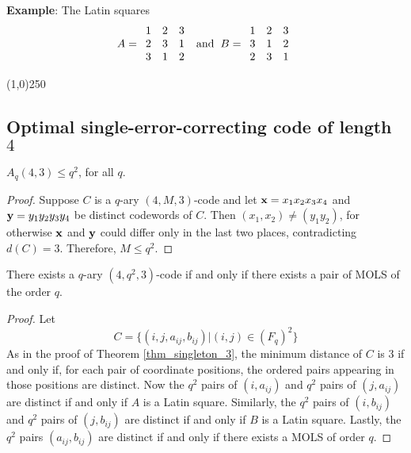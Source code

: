 \documentclass[../main.tex]{subfiles}
\begin{document}
\textbf{Example}: The Latin squares 
\[	A=
	\begin{array}{ccc}
		1 & 2 & 3\\
		2 & 3 & 1\\
		3 & 1 & 2
	\end{array}
	\hspace{2mm}
	\text{and}
	\hspace{2mm}
	B=
	\begin{array}{ccc}
		1 & 2 & 3\\
		3 & 1 & 2\\
		2 & 3 & 1
	\end{array}
\]

\begin{center}
\line(1,0){250}
\end{center}
   
\subsection{Optimal single-error-correcting code of length $4$}

\begin{thm}\label{thm_singleton_3}
	$A_q(4,3)\leq q^2$, for all $q$.
\end{thm}

\begin{proof}
	Suppose $C$ is a $q$-ary $(4,M,3)$-code and let $\textbf{x}=x_1x_2x_3x_4$ and $\textbf{y}=y_1y_2y_3y_4$ be distinct codewords of $C$. Then $(x_1,x_2)\neq (y_1y_2)$, for otherwise $\textbf{x}$ and $\textbf{y}$ could differ only in the last two places, contradicting $d(C)=3$. Therefore, $M\leq q^2$.
\end{proof}

\begin{thm}\label{thm_equiv}
	There exists a $q$-ary $(4,q^2,3)$-code if and only if there exists a pair of MOLS of the order $q$.
\end{thm}

\begin{proof}
	Let 
	\[
		C = \{(i,j,a_{ij},b_{ij})| (i,j)\in (F_q)^2 \}
	\]
	As in the proof of Theorem \ref{thm_singleton_3}, the minimum distance of $C$ is $3$ if and only if, for each pair of coordinate positions, the ordered pairs appearing in those positions are distinct. Now the $q^2$ pairs of $(i,a_{ij})$ and $q^2$ pairs of $(j,a_{ij})$ are distinct if and only if $A$ is a Latin square. Similarly, the $q^2$ pairs of $(i,b_{ij})$ and $q^2$ pairs of $(j,b_{ij})$ are distinct if and only if $B$ is a Latin square. Lastly, the $q^2$ pairs $(a_{ij},b_{ij})$ are distinct if and only if there exists a MOLS of order $q$.
\end{proof}
\end{document}

